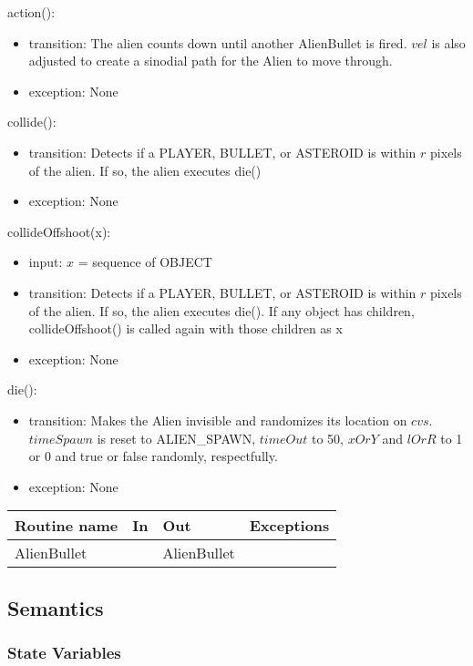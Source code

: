 \documentclass[12pt]{article}
\begin{document}
action():
\begin{itemize}
  \item transition: The alien counts down until another AlienBullet is fired. $vel$ is also adjusted to create a sinodial path for the Alien to move through.
  \item exception: None
\end{itemize}

collide():
\begin{itemize}
  \item transition: Detects if a PLAYER, BULLET, or ASTEROID is within $r$ pixels of the alien. If so, the alien executes die()
  \item exception: None
\end{itemize}

collideOffshoot(x):
\begin{itemize}
  \item input: $x$ = sequence of OBJECT
  \item transition: Detects if a PLAYER, BULLET, or ASTEROID is within $r$ pixels of the alien. If so, the alien executes die(). If any object has children, collideOffshoot() is called again with those children as x
  \item exception: None
\end{itemize}

die():
\begin{itemize}
  \item transition: Makes the Alien invisible and randomizes its location on $cvs$. $timeSpawn$ is reset to ALIEN\_SPAWN, $timeOut$ to 50, $xOrY$ and $lOrR$ to 1 or 0 and true or false randomly, respectfully.
  \item exception: None
\end{itemize}

\begin{tabular}{| l | l | l | l |}
    \hline
    \textbf{Routine name} & \textbf{In} & \textbf{Out} & \textbf{Exceptions}\\
    \hline
    AlienBullet & ~ & AlienBullet & ~\\
    \hline
\end{tabular}

\subsection* {Semantics}

\subsubsection* {State Variables}
\end{document}

